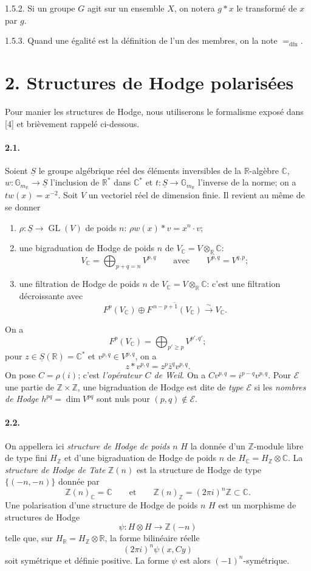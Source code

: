 \documentclass[10pt,leqno]{article}
\newcommand{\C}{\mathbb{C}}
\newcommand{\R}{\mathbb{R}}
\newcommand{\Z}{\mathbb{Z}}
\newcommand{\GL}{\operatorname{GL}}
\newcommand{\dfn}{\mathrm{dfn}}
\newcommand{\iso}{\xrightarrow{\sim}}
\begin{document}
1.5.2. Si un groupe $G$ agit sur un ensemble $X$, on notera $g*x$ le transformé de $x$ par $g$.

1.5.3. Quand une égalité est la définition de l'un des membres, on la note $=_{\dfn}$.

\section*{2. Structures de Hodge polarisées}

Pour manier les structures de Hodge, nous utiliserons le formalisme exposé dans [4] et brièvement rappelé ci-dessous.

\paragraph{2.1.} Soient $\underline S$ le groupe algébrique réel des éléments inversibles de la $\R$-algèbre $\C$, $w:\mathbb G_{m_{\R}}\to\underline S$ l'inclusion de $\R^*$ dans $\C^*$ et $t:\underline S\to\mathbb G_{m_{\R}}$ l'inverse de la norme; on a $t w(x)=x^{-2}$. Soit $V$ un vectoriel réel de dimension finie. Il revient au même de se donner
\begin{enumerate}[label=\alph*)]
\item $\rho:\underline S\to\GL(V)$ de poids $n$: $\rho w(x)*v=x^n\cdot v$;
\item une bigraduation de Hodge de poids $n$ de $V_\C=V\otimes_\R\C$:
\[
V_\C=\bigoplus_{p+q=n}V^{p,q}\qquad\text{avec}\qquad \overline{V^{p,q}}=V^{q,p};
\]
\item une filtration de Hodge de poids $n$ de $V_\C=V\otimes_\R\C$: c'est une filtration décroissante avec
\[
F^p(V_\C)\oplus\overline{F^{\,n-p+1}(V_\C)}\iso V_\C.
\]
\end{enumerate}

\clearpage

On a
\[
F^p(V_\C)=\bigoplus_{p'\ge p}V^{p',q'};
\]
pour $z\in\underline S(\R)=\C^*$ et $v^{p,q}\in V^{p,q}$, on a
\[
z*v^{p,q}=z^p\bar z^qv^{p,q}.
\]
On pose $C=\rho(i)$; c'est \emph{l'opérateur $C$ de Weil}. On a $Cv^{p,q}=i^{p-q}v^{p,q}$. Pour $\mathscr E$ une partie de $\Z\times\Z$, une bigraduation de Hodge est dite de \emph{type $\mathscr E$} si les \emph{nombres de Hodge} $h^{pq}=\dim V^{pq}$ sont nuls pour $(p,q)\notin\mathscr E$.

\paragraph{2.2.} On appellera ici \emph{structure de Hodge de poids $n$} $H$ la donnée d'un $\Z$-module libre de type fini $H_\Z$ et d'une bigraduation de Hodge de poids $n$ de $H_\C=H_\Z\otimes\C$. La \emph{structure de Hodge de Tate} $\Z(n)$ est la structure de Hodge de type $\{(-n,-n)\}$ donnée par
\[
\Z(n)_\C=\C
\qquad\text{et}\qquad
\Z(n)_\Z=(2\pi i)^n\Z\subset\C.
\]
Une polarisation d'une structure de Hodge de poids $n$ $H$ est un morphisme de structures de Hodge
\[
\psi:H\otimes H\longrightarrow\Z(-n)
\]
telle que, sur $H_\R=H_\Z\otimes\R$, la forme bilinéaire réelle
\[
(2\pi i)^n\psi(x,Cy)
\]
soit symétrique et définie positive. La forme $\psi$ est alors $(-1)^n$-symétrique.
\end{document}
